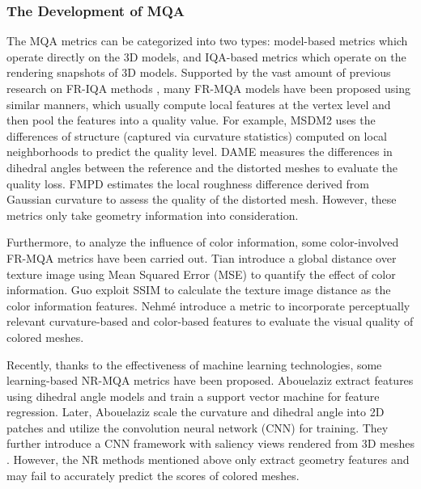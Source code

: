 \documentclass[lettersize,journal]{IEEEtran}
\begin{document}
\subsubsection{The Development of MQA}
The MQA metrics can be categorized into two types: model-based metrics \cite{m1} \cite{ff2_roughness} \cite{dame} \cite{nr-svr} \cite{nr-cnn} which operate directly on the 3D models, and IQA-based metrics \cite{tian-color} \cite{guo-color} \cite{nr-cnncmp} \cite{2d1} \cite{2d2} which operate on the rendering snapshots of 3D models.
Supported by the vast amount of previous research on FR-IQA methods \cite{ms-ssim,fsim,vif}, many FR-MQA models have been proposed using similar manners, which usually compute local features at the vertex level and then pool the features into a quality value. For example, MSDM2 \cite{m1} uses the differences of structure (captured via curvature statistics) computed on local neighborhoods to predict the quality level. DAME \cite{dame} measures the differences in dihedral angles between the reference and the distorted meshes to evaluate the quality loss. FMPD \cite{ff2_roughness} estimates the local roughness difference derived from Gaussian curvature to assess the quality of the distorted mesh. However, these metrics only take geometry information into consideration.

Furthermore, to analyze the influence of color information, some color-involved FR-MQA metrics have been carried out. Tian   \cite{tian-color} introduce a global distance over texture image using Mean Squared Error (MSE) to quantify the effect of color information. Guo   \cite{guo-color} exploit SSIM to calculate the texture image distance as the color information features. Nehmé   \cite{database} introduce a metric to incorporate perceptually relevant curvature-based and color-based features to evaluate the visual quality of colored meshes.

Recently, thanks to the effectiveness of machine learning technologies, some learning-based NR-MQA metrics have been proposed. Abouelaziz   \cite{nr-svr} extract features using dihedral angle models and train a support vector machine for feature regression. Later, Abouelaziz   \cite{nr-cnn} scale the curvature and dihedral angle into 2D patches and utilize the convolution neural network (CNN) for training. They further introduce a CNN framework with saliency views rendered from 3D meshes \cite{nr-cnncmp}. However, the NR methods mentioned above only extract geometry features and may fail to accurately predict the scores of colored meshes.
\end{document}

